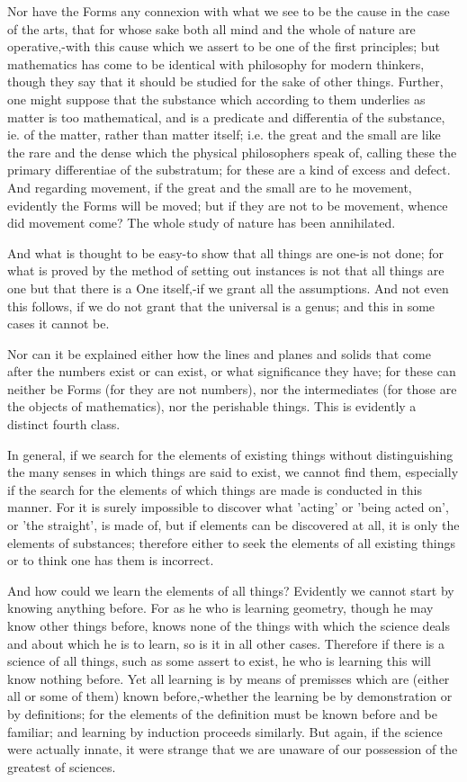 \documentclass{article}
\begin{document}
Nor have the Forms any connexion with what we see to be the cause in the case of the arts, that for whose sake both all mind and the whole of nature are operative,-with this cause which we assert to be one of the first principles; but mathematics has come to be identical with philosophy for modern thinkers, though they say that it should be studied for the sake of other things. Further, one might suppose that the substance which according to them underlies as matter is too mathematical, and is a predicate and differentia of the substance, ie. of the matter, rather than matter itself; i.e. the great and the small are like the rare and the dense which the physical philosophers speak of, calling these the primary differentiae of the substratum; for these are a kind of excess and defect. And regarding movement, if the great and the small are to he movement, evidently the Forms will be moved; but if they are not to be movement, whence did movement come? The whole study of nature has been annihilated.

And what is thought to be easy-to show that all things are one-is not done; for what is proved by the method of setting out instances is not that all things are one but that there is a One itself,-if we grant all the assumptions. And not even this follows, if we do not grant that the universal is a genus; and this in some cases it cannot be.

Nor can it be explained either how the lines and planes and solids that come after the numbers exist or can exist, or what significance they have; for these can neither be Forms (for they are not numbers), nor the intermediates (for those are the objects of mathematics), nor the perishable things. This is evidently a distinct fourth class.

In general, if we search for the elements of existing things without distinguishing the many senses in which things are said to exist, we cannot find them, especially if the search for the elements of which things are made is conducted in this manner. For it is surely impossible to discover what 'acting' or 'being acted on', or 'the straight', is made of, but if elements can be discovered at all, it is only the elements of substances; therefore either to seek the elements of all existing things or to think one has them is incorrect.

And how could we learn the elements of all things? Evidently we cannot start by knowing anything before. For as he who is learning geometry, though he may know other things before, knows none of the things with which the science deals and about which he is to learn, so is it in all other cases. Therefore if there is a science of all things, such as some assert to exist, he who is learning this will know nothing before. Yet all learning is by means of premisses which are (either all or some of them) known before,-whether the learning be by demonstration or by definitions; for the elements of the definition must be known before and be familiar; and learning by induction proceeds similarly. But again, if the science were actually innate, it were strange that we are unaware of our possession of the greatest of sciences.
\end{document}
